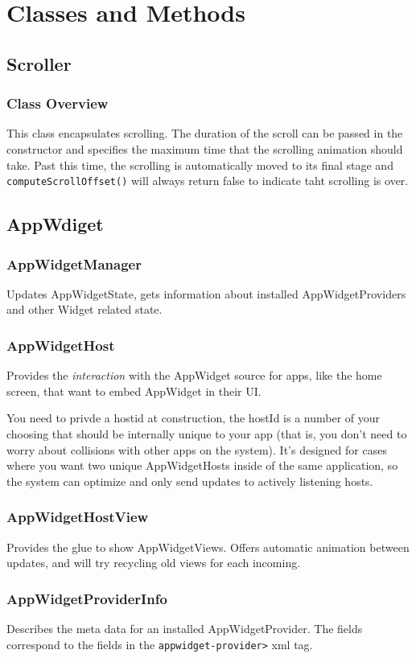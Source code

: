 \documentclass[11pt, a4paper]{book}
\begin{document}
\chapter{Classes and Methods}
\section{Scroller}
\subsection{Class Overview}
This class encapsulates scrolling. The duration of the scroll can be passed
 in the constructor and specifies the maximum time that the scrolling animation
should take. Past this time, the scrolling is automatically moved to its final
stage and \verb|computeScrollOffset()| will always return false to indicate taht
scrolling is over.

\section{AppWdiget}

\subsection{AppWidgetManager}
Updates AppWidgetState, gets information about installed AppWidgetProviders and
other Widget related state.
\subsection{AppWidgetHost}
Provides the \emph{interaction} with the AppWidget source for apps, like the
home screen, that want to embed AppWidget in their UI.

You need to privde a hostid at construction, the hostId is a number of your 
choosing that should be internally unique to your app (that is, you don't 
need to worry about collisions with other apps on the system).  It's designed 
for cases where you want two unique AppWidgetHosts inside of the same 
application, so the system can optimize and only send updates to actively 
listening hosts. 

\subsection{AppWidgetHostView}
Provides the glue to show AppWidgetViews. Offers automatic animation between
updates, and will try recycling old views for each incoming.
\subsection{AppWidgetProviderInfo}
Describes the meta data for an installed AppWidgetProvider. The fields
correspond to the fields in the \verb|appwidget-provider>| xml tag.
\end{document}
